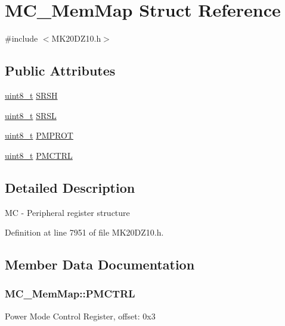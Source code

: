\hypertarget{struct_m_c___mem_map}{}\section{M\+C\+\_\+\+Mem\+Map Struct Reference}
\label{struct_m_c___mem_map}


{\ttfamily \#include $<$M\+K20\+D\+Z10.\+h$>$}

\subsection*{Public Attributes}
\begin{DoxyCompactItemize}
\item 
\hyperlink{_p_e___types_8h_aba7bc1797add20fe3efdf37ced1182c5}{uint8\+\_\+t} \hyperlink{struct_m_c___mem_map_afcccae19489d29a8edafec4f949b33d2}{S\+R\+SH}
\item 
\hyperlink{_p_e___types_8h_aba7bc1797add20fe3efdf37ced1182c5}{uint8\+\_\+t} \hyperlink{struct_m_c___mem_map_a30d9c6061830ab2b5eb71ce3a31e0f33}{S\+R\+SL}
\item 
\hyperlink{_p_e___types_8h_aba7bc1797add20fe3efdf37ced1182c5}{uint8\+\_\+t} \hyperlink{struct_m_c___mem_map_a757aa627fdb6c7a5b724ddf9ca47afdb}{P\+M\+P\+R\+OT}
\item 
\hyperlink{_p_e___types_8h_aba7bc1797add20fe3efdf37ced1182c5}{uint8\+\_\+t} \hyperlink{struct_m_c___mem_map_aa56e1e7f2bc106a9fc8fdba356e4e7bf}{P\+M\+C\+T\+RL}
\end{DoxyCompactItemize}


\subsection{Detailed Description}
MC -\/ Peripheral register structure 

Definition at line 7951 of file M\+K20\+D\+Z10.\+h.



\subsection{Member Data Documentation}
\subsubsection[{\texorpdfstring{P\+M\+C\+T\+RL}{PMCTRL}}]{ M\+C\+\_\+\+Mem\+Map\+::\+P\+M\+C\+T\+RL}\hypertarget{struct_m_c___mem_map_aa56e1e7f2bc106a9fc8fdba356e4e7bf}{}\label{struct_m_c___mem_map_aa56e1e7f2bc106a9fc8fdba356e4e7bf}
Power Mode Control Register, offset\+: 0x3 


